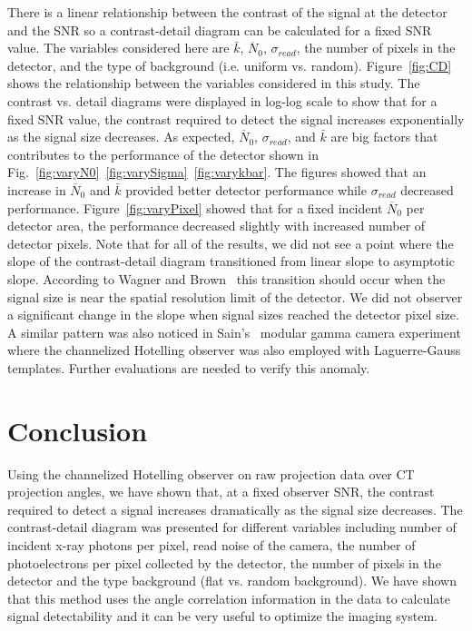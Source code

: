%
%
There is a linear relationship between the contrast of the signal at the detector and the SNR so a contrast-detail diagram can be calculated for a fixed SNR value.  The variables considered here are $\bar{k}$, $\overline{N}_0$, $\sigma_{read}$, the number of pixels in the detector, and the type of background (i.e. uniform vs. random).  Figure~\ref{fig:CD} shows the relationship between the variables considered in this study.  The contrast vs. detail diagrams were displayed in log-log scale to show that for a fixed SNR value, the contrast required to detect the signal increases exponentially as the signal size decreases.  As expected, $\overline{N}_0$, $\sigma_{read}$, and $\bar{k}$ are big factors that contributes to the performance of the detector shown in Fig.~\ref{fig:varyN0}~\ref{fig:varySigma}~\ref{fig:varykbar}.  The figures showed that an increase in  $\overline{N}_0$ and $\bar{k}$ provided better detector performance while $\sigma_{read}$ decreased performance.  Figure~\ref{fig:varyPixel} showed that for a fixed incident $\overline{N}_0$ per detector area, the performance decreased slightly with increased number of detector pixels.  Note that for all of the results, we did not see a point where the slope of the contrast-detail diagram transitioned from linear slope to asymptotic slope. According to Wagner and Brown~\citep{Wagner1979} this transition should occur when the signal size is near the spatial resolution limit of the detector.  We did not observer a significant change in the slope when signal sizes reached the detector pixel size.  A similar pattern was also noticed in Sain's~\citep{Sain2003} modular gamma camera experiment where the channelized Hotelling observer was also employed with Laguerre-Gauss templates.  Further evaluations are needed to verify this anomaly.

\section{Conclusion}
Using the channelized Hotelling observer on raw projection data over CT projection angles, we have shown that, at a fixed observer SNR, the contrast required to detect a signal increases dramatically as the signal size decreases.  The contrast-detail diagram was presented for different variables including number of incident x-ray photons per pixel, read noise of the camera, the number of photoelectrons per pixel collected by the detector, the number of pixels in the detector and the type background (flat vs. random background).  We have shown that this method uses the angle correlation information in the data to calculate signal detectability and it can be very useful to optimize the imaging system.